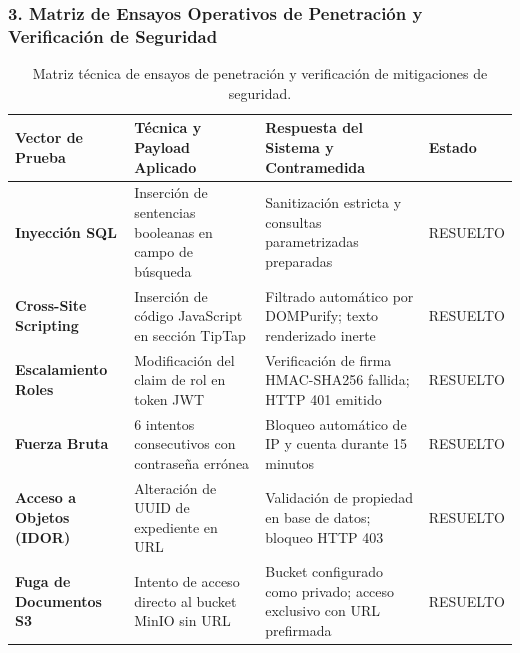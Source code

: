 \documentclass[12pt,a4paper]{article}
\begin{document}
\subsubsection*{3. Matriz de Ensayos Operativos de Penetración y Verificación de Seguridad}
\begin{table}[H]
\centering
\small
\renewcommand{\arraystretch}{1.2}
\begin{tabularx}{\textwidth}{|>{\hsize=0.55\hsize\centering\arraybackslash\bfseries\footnotesize}X|>{\hsize=1.25\hsize\raggedright\arraybackslash\footnotesize}X|>{\hsize=1.65\hsize\raggedright\arraybackslash\footnotesize}X|>{\hsize=0.55\hsize\centering\arraybackslash\footnotesize}X|}
\hline
\rowcolor{tableheader}
\textbf{Vector de Prueba} & \textbf{Técnica y Payload Aplicado} & \textbf{Respuesta del Sistema y Contramedida} & \textbf{Estado} \\
\hline
Inyección SQL & Inserción de sentencias booleanas en campo de búsqueda & Sanitización estricta y consultas parametrizadas preparadas & RESUELTO \\
\hline
Cross-Site Scripting & Inserción de código JavaScript en sección TipTap & Filtrado automático por DOMPurify; texto renderizado inerte & RESUELTO \\
\hline
Escalamiento Roles & Modificación del claim de rol en token JWT & Verificación de firma HMAC-SHA256 fallida; HTTP 401 emitido & RESUELTO \\
\hline
Fuerza Bruta & 6 intentos consecutivos con contraseña errónea & Bloqueo automático de IP y cuenta durante 15 minutos & RESUELTO \\
\hline
Acceso a Objetos (IDOR) & Alteración de UUID de expediente en URL & Validación de propiedad en base de datos; bloqueo HTTP 403 & RESUELTO \\
\hline
Fuga de Documentos S3 & Intento de acceso directo al bucket MinIO sin URL & Bucket configurado como privado; acceso exclusivo con URL prefirmada & RESUELTO \\
\hline
\end{tabularx}
\caption{Matriz técnica de ensayos de penetración y verificación de mitigaciones de seguridad.}
\end{table}
\end{document}
